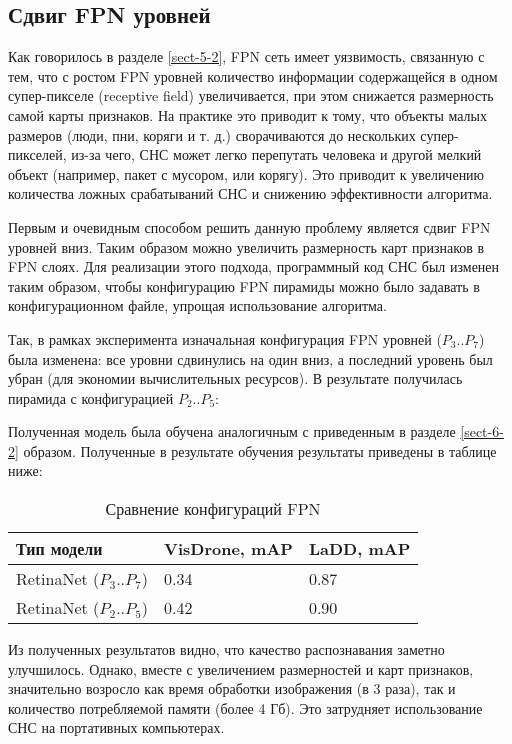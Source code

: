 \subsection{Сдвиг FPN уровней} \label{sect-6-3}

Как говорилось в разделе \ref{sect-5-2}, FPN сеть имеет уязвимость, связанную с тем, что с ростом FPN уровней количество информации содержащейся в одном супер-пикселе (receptive field) увеличивается, при этом снижается размерность самой карты признаков. На практике это приводит к тому, что объекты малых размеров (люди, пни, коряги и т. д.) сворачиваются до нескольких супер-пикселей, из-за чего, СНС может легко перепутать человека и другой мелкий объект (например, пакет с мусором, или корягу). Это приводит к увеличению количества ложных срабатываний СНС и снижению эффективности алгоритма.

Первым и очевидным способом решить данную проблему является сдвиг FPN уровней вниз. Таким образом можно увеличить размерность карт признаков в FPN слоях. Для реализации этого подхода, программный код СНС был изменен таким образом, чтобы конфигурацию FPN пирамиды можно было задавать в конфигурационном файле, упрощая использование алгоритма. 

Так, в рамках эксперимента изначальная конфигурация FPN уровней ($P_3..P_7$) была изменена: все уровни сдвинулись на один вниз, а последний уровень был убран (для экономии вычислительных ресурсов). В результате получилась пирамида с конфигурацией $P_2..P_5$:


Полученная модель была обучена аналогичным с приведенным в разделе \ref{sect-6-2} образом. Полученные в результате обучения результаты приведены в таблице ниже:

\begin{table}[H]
    \caption{Сравнение конфигураций FPN}\label{leaderboard-3}
    \begin{tabular}{|p{5cm}|p{5cm}|p{5cm}|}
        \hline
        {Тип модели} & {VisDrone, mAP} & {LaDD, mAP} \\
        \hline
        RetinaNet ($P_3..P_7$) & 0.34 & 0.87 \\
        \hline
        RetinaNet ($P_2..P_5$) & 0.42 & 0.90 \\
        \hline
    \end{tabular}
\end{table}

Из полученных результатов видно, что качество распознавания заметно улучшилось. Однако, вместе с увеличением размерностей и карт признаков, значительно возросло как время обработки изображения (в 3 раза), так и количество потребляемой памяти (более 4 Гб). Это затрудняет использование СНС на портативных компьютерах.